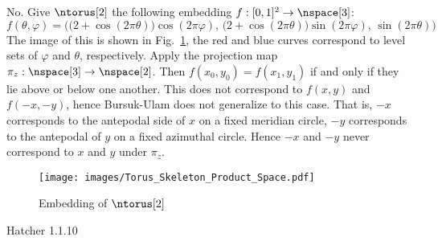     \begin{solution}
        No. Give $\ntorus[2]$ the following embedding
        $f:[0,1]^{2}\rightarrow\nspace[3]$:
        \begin{equation}
            f(\theta,\varphi)=\Big(
                \big(2+\cos(2\pi\theta)\big)\cos(2\pi\varphi),\,
                \big(2+\cos(2\pi\theta)\big)\sin(2\pi\varphi),\,
                \sin(2\pi\theta)
            \Big)
        \end{equation}
        The image of this is shown in Fig.~\ref{fig:Embedding_of_Torus}, the
        red and blue curves correspond to level sets of
        $\varphi$ and $\theta$, respectively. Apply the projection map
        $\pi_{z}:\nspace[3]\rightarrow\nspace[2]$. Then
        $f(x_{0},y_{0})=f(x_{1},y_{1})$ if and only if they lie above or below
        one another. This does not correspond to $f(x,y)$ and
        $f(\minus{x},\minus{y})$, hence Bursuk-Ulam does not generalize to this
        case. That is, $\minus{x}$ corresponds to the antepodal side of $x$ on
        a fixed meridian circle, $\minus{y}$ corresponds to the antepodal of
        $y$ on a fixed azimuthal circle. Hence $\minus{x}$ and $\minus{y}$
        never correspond to $x$ and $y$ under $\pi_{z}$.
    \end{solution}
    \begin{figure}[H]
        \centering
        \captionsetup{type=figure}
        \texttt{[image: images/Torus\_Skeleton\_Product\_Space.pdf]}
        \caption{Embedding of $\ntorus[2]$}
        \label{fig:Embedding_of_Torus}
    \end{figure}
    \begin{problem}
        Hatcher 1.1.10
    \end{problem}

